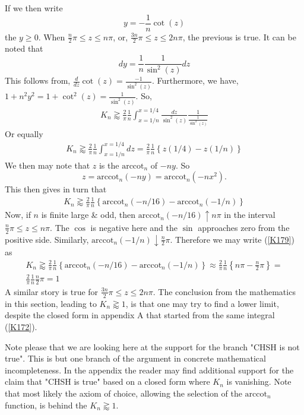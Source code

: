 \documentclass{appolb}
\newcommand{\arccot}{\text{arccot}}
\begin{document}
If we then write \[y=-\frac{1}{n}\cot(z)\]
the $y\geq 0$. 
When $\frac{n}{2}\pi\leq z\leq n\pi$, or, $\frac{3n}{2}\pi\leq z\leq 2n\pi$, the previous is true. It can be noted that \[dy=\frac{1}{n}\frac{1}{\sin^2(z)}dz\]  
This follows from, $ \frac{d}{dz}\cot(z)=\frac{-1}{\sin^2(z)}$.
Furthermore, we have, $1+n^2y^2=1+\cot^2(z)=\frac{1}{\sin^2(z)}$. So,
\begin{eqnarray}\label{K177}
K_n \gtrapprox \frac{2}{\pi}\frac{1}{n} \int_{x=1/n}^{x=1/4} \frac{dz}{\sin^2(z)}\frac{1}{\frac{1}{\sin^2(z)}} 
\end{eqnarray}
Or equally
\begin{eqnarray}\label{K178}
K_n \gtrapprox \frac{2}{\pi}\frac{1}{n} \int_{x=1/n}^{x=1/4} dz
=\frac{2}{\pi}\frac{1}{n}\left\{z(1/4)-z(1/n) \right\}
\end{eqnarray}
We then may note that $z$ is the $\arccot_n$ of $-ny$. So \[z=\arccot_n(-ny)=\arccot_n(-nx^2).\]
This then gives in turn that
\begin{eqnarray}\label{K179}
K_n \gtrapprox \frac{2}{\pi}\frac{1}{n}\left\{\arccot_n(-n/16)-\arccot_n(-1/n) \right\}
\end{eqnarray}
Now, if $n$ is finite large \& odd, then $\arccot_n(-n/16)\uparrow n\pi$ in the interval $\frac{n}{2}\pi\leq z\leq n\pi$. The $\cos$ is negative here and the $\sin $ approaches zero from the positive side. Similarly, $\arccot_n(-1/n)\downarrow \frac{n}{2}\pi$. 
Therefore we may write (\ref{K179}) as
\begin{eqnarray}\label{K1710}
K_n \gtrapprox \frac{2}{\pi}\frac{1}{n} \left\{\arccot_n(-n/16)-\arccot_n(-1/n) \right\}\approx \frac{2}{\pi}\frac{1}{n}\left\{n\pi-\frac{n}{2}\pi \right\}
=\\\nonumber
\frac{2}{\pi}\frac{1}{n}\frac{n}{2}\pi= 1
\end{eqnarray}
A similar story is true for  $\frac{3n}{2}\pi\leq z\leq 2n\pi$.
The conclusion from the mathematics in this section, leading to $K_n\gtrapprox 1$, is that one may try to find a lower limit, despite the closed form in appendix A that started from the same integral (\ref{K172}). 

Note please that we are looking here at the support for the branch "CHSH is not true". 
This is but one branch of the argument in concrete mathematical incompleteness. In the appendix the reader may find additional support for the claim that "CHSH is true" based on a closed form where $K_n$ is vanishing.
Note that most likely the axiom of choice, allowing the selection of the $\arccot_n$ function, is behind the $K_n\gtrapprox 1$. 
\end{document}
